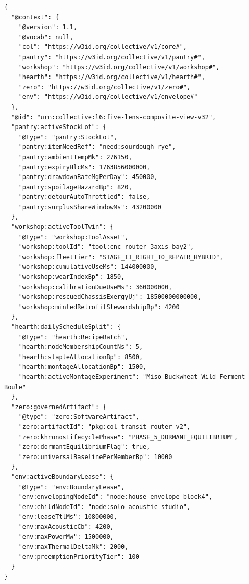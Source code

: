 \begin{lstlisting}[language=jsonld,caption={Canonical JSON-LD payload uniting the Five Layer~6 Lens projections over \texttt{col-commonsd} (v3.2).},label={lst:ch4-five-lens-jsonld}]
{
  "@context": {
    "@version": 1.1,
    "@vocab": null,
    "col": "https://w3id.org/collective/v1/core#",
    "pantry": "https://w3id.org/collective/v1/pantry#",
    "workshop": "https://w3id.org/collective/v1/workshop#",
    "hearth": "https://w3id.org/collective/v1/hearth#",
    "zero": "https://w3id.org/collective/v1/zero#",
    "env": "https://w3id.org/collective/v1/envelope#"
  },
  "@id": "urn:collective:l6:five-lens-composite-view-v32",
  "pantry:activeStockLot": {
    "@type": "pantry:StockLot",
    "pantry:itemNeedRef": "need:sourdough_rye",
    "pantry:ambientTempMk": 276150,
    "pantry:expiryHlcMs": 1763856000000,
    "pantry:drawdownRateMgPerDay": 450000,
    "pantry:spoilageHazardBp": 820,
    "pantry:detourAutoThrottled": false,
    "pantry:surplusShareWindowMs": 43200000
  },
  "workshop:activeToolTwin": {
    "@type": "workshop:ToolAsset",
    "workshop:toolId": "tool:cnc-router-3axis-bay2",
    "workshop:fleetTier": "STAGE_II_RIGHT_TO_REPAIR_HYBRID",
    "workshop:cumulativeUseMs": 144000000,
    "workshop:wearIndexBp": 1850,
    "workshop:calibrationDueUseMs": 360000000,
    "workshop:rescuedChassisExergyUj": 18500000000000,
    "workshop:mintedRetrofitStewardshipBp": 4200
  },
  "hearth:dailyScheduleSplit": {
    "@type": "hearth:RecipeBatch",
    "hearth:nodeMembershipCountNs": 5,
    "hearth:stapleAllocationBp": 8500,
    "hearth:montageAllocationBp": 1500,
    "hearth:activeMontageExperiment": "Miso-Buckwheat Wild Ferment Boule"
  },
  "zero:governedArtifact": {
    "@type": "zero:SoftwareArtifact",
    "zero:artifactId": "pkg:col-transit-router-v2",
    "zero:khronosLifecyclePhase": "PHASE_5_DORMANT_EQUILIBRIUM",
    "zero:dormantEquilibriumFlag": true,
    "zero:universalBaselinePerMemberBp": 10000
  },
  "env:activeBoundaryLease": {
    "@type": "env:BoundaryLease",
    "env:envelopingNodeId": "node:house-envelope-block4",
    "env:childNodeId": "node:solo-acoustic-studio",
    "env:leaseTtlMs": 10800000,
    "env:maxAcousticCb": 4200,
    "env:maxPowerMw": 1500000,
    "env:maxThermalDeltaMk": 2000,
    "env:preemptionPriorityTier": 100
  }
}
\end{lstlisting}

